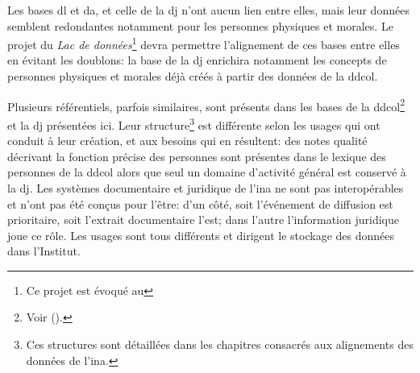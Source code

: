 Les bases \ac{dl} et \ac{da}, et celle de la \ac{dj} n'ont aucun lien entre elles, mais leur données semblent redondantes notamment pour les personnes physiques et morales. Le projet du \textit{Lac de données}\footnote{Ce projet est évoqué au } devra permettre l'alignement de ces bases entre elles en évitant les doublons: la base de la \ac{dj} enrichira notamment les concepts de personnes physiques et morales déjà créés à partir des données de la \ac{ddcol}.

\bigskip
\bigskip

Plusieurs référentiels, parfois similaires, sont présents dans les bases de la \ac{ddcol}\footnote{Voir  ().} et la \ac{dj} présentées ici. Leur structure\footnote{Ces structures sont détaillées dans les chapitres consacrés aux alignements des données de l'\ac{ina}.} est différente selon les usages qui ont conduit à leur création, et aux besoins qui en résultent: des notes qualité décrivant la fonction précise des personnes sont présentes dans le lexique des personnes de la \ac{ddcol} alors que seul un domaine d'activité général est conservé à la \ac{dj}. Les systèmes documentaire et juridique de l'\ac{ina} ne sont pas interopérables et n'ont pas été conçus pour l'être: d'un côté, soit l'événement de diffusion est prioritaire, soit l'extrait documentaire l'est; dans l'autre l'information juridique joue ce rôle. Les usages sont tous différents et dirigent le stockage des données dans l'Institut.